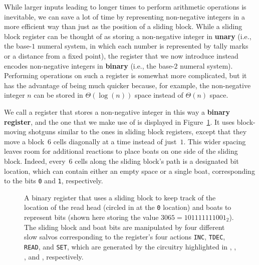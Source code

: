 While larger inputs leading to longer times to perform arithmetic operations is inevitable, we can save a lot of time by representing non-negative integers in a more efficient way than just as the position of a sliding block. While a sliding block register can be thought of as storing a non-negative integer in \textbf{unary} (i.e., the base-$1$ numeral system, in which each number is represented by tally marks or a distance from a fixed point), the register that we now introduce instead encodes non-negative integers in \textbf{binary} (i.e., the base-$2$ numeral system). Performing operations on such a register is somewhat more complicated, but it has the advantage of being much quicker because, for example, the non-negative integer $n$ can be stored in $\Theta(\log(n))$ space instead of $\Theta(n)$ space.%

We call a register that stores a non-negative integer in this way a \textbf{binary register}, and the one that we make use of is displayed in Figure~\ref{fig:binary_register}. It uses block-moving shotguns similar to the ones in sliding block registers, except that they move a block~$6$ cells diagonally at a time instead of just~$1$. This wider spacing leaves room for additional reactions to place boats on one side of the sliding block. Indeed, every~$6$ cells along the sliding block's path is a designated bit location, which can contain either an empty space or a single boat, corresponding to the bits \texttt{0} and \texttt{1}, respectively.

\begin{figure}[!htb]
	\centering
	\caption{A binary register that uses a sliding block to keep track of the location of the read head (circled in  at the \texttt{0} location) and boats to represent bits (shown here storing the value $3065 = 101111111001_2$). The sliding block and boat bits are manipulated by four different slow salvos corresponding to the register's four actions \texttt{INC}, \texttt{TDEC}, \texttt{READ}, and \texttt{SET}, which are generated by the circuitry highlighted in , , , and , respectively.}\label{fig:binary_register}
\end{figure}

